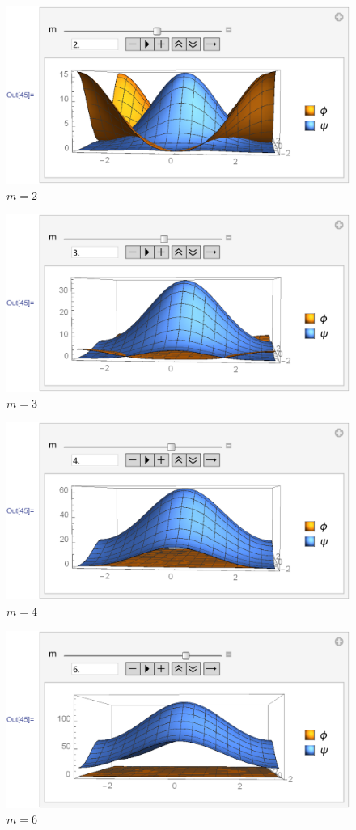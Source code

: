 \documentclass{article}
\begin{document}
    \begin{figure}[H]
        \centering
        \includegraphics[width=0.6\linewidth]{pics/OpenBC-inXY/Eigen-m2.pdf}
        \caption{$m=2$}
    \end{figure}
    \begin{figure}[H]
        \centering
        \includegraphics[width=0.6\linewidth]{pics/OpenBC-inXY/Eigen-m3.pdf}
        \caption{$m=3$}
    \end{figure}
    \begin{figure}[H]
        \centering
        \includegraphics[width=0.6\linewidth]{pics/OpenBC-inXY/Eigen-m4.pdf}
        \caption{$m=4$}
    \end{figure}
    \begin{figure}[H]
        \centering
        \includegraphics[width=0.6\linewidth]{pics/OpenBC-inXY/Eigen-m6.pdf}
        \caption{$m=6$}
    \end{figure}
\end{document}
